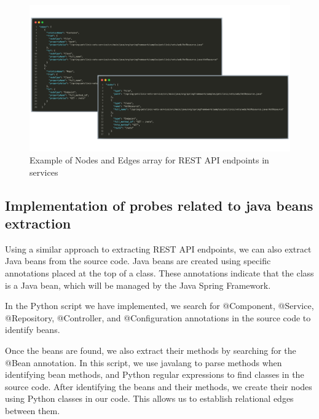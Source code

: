 \begin{figure}[H]
    \centering
    \includegraphics[width=1\textwidth]{figures/nodes_edges_example2.png}
    \caption{Example of Nodes and Edges array for REST API endpoints in services}
    \label{fig:example_nodes_edges_endpoints}
\end{figure}

\subsection{Implementation of probes related to java beans extraction}

Using a similar approach to extracting REST API endpoints, we can also extract Java beans from the source code. Java beans are created using specific annotations placed at the top of a class. These annotations indicate that the class is a Java bean, which will be managed by the Java Spring Framework.

In the Python script we have implemented, we search for @Component, @Service, @Repository, @Controller, and @Configuration annotations in the source code to identify beans.

Once the beans are found, we also extract their methods by searching for the @Bean annotation. In this script, we use javalang to parse methods when identifying bean methods, and Python regular expressions to find classes in the source code. After identifying the beans and their methods, we create their nodes using Python classes in our code. This allows us to establish relational edges between them.

